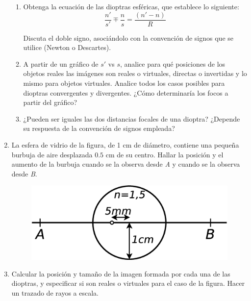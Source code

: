 \documentclass[11pt,spanish]{article}
\begin{document}
\begin{enumerate}
\begin{figure}[H]
    \end{figure}
    
    \begin{enumerate}
    
        \item Obtenga la ecuación de las dioptras esféricas, que establece lo
        siguiente:
        \[
        \frac{n'}{s'}\mp\frac{n}{s}=\frac{(n'-n)}{R}
        \]
        
        Discuta el doble signo, asociándolo con la convención de signos que se
        utilice (Newton o Descartes).
    
        \item A partir de un gráfico de $s'$ vs $s$, analice para qué posiciones
        de los objetos reales las imágenes son reales o virtuales, directas o
        invertidas y lo mismo para objetos virtuales. Analice todos los casos
        posibles para dioptras convergentes y divergentes. ¿Cómo determinaría
        los focos a partir del gráfico?
    
        \item ¿Pueden ser iguales las dos distancias focales de una dioptra?
        ¿Depende su respuesta de la convención de signos empleada?

    \end{enumerate}


    \item La esfera de vidrio de la figura, de 1 cm de diámetro, contiene una
    pequeña burbuja de aire desplazada $0.5$ cm de su centro. Hallar
    la posición y el aumento de la burbuja cuando se la observa desde
    \emph{A} y cuando se la observa desde \emph{B}.

    \begin{figure}[H]
        \centering{}\includegraphics[clip,scale=0.25]{figs/ej3-17}
    \end{figure}


    \item Calcular la posición y tamaño de la imagen formada por cada una de las
    dioptras, y especificar si son reales o virtuales para el caso de la figura.
    Hacer un trazado de rayos a escala.


\end{enumerate}
\end{document}
